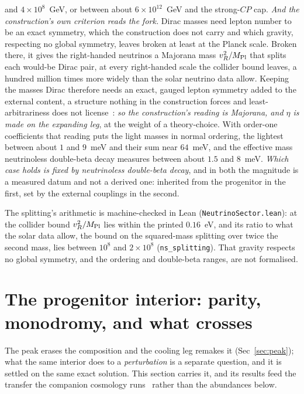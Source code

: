 \documentclass[11pt,a4paper]{article}
\theoremstyle{plain}
\theoremstyle{definition}
\theoremstyle{remark}
\begin{document}
and $4\times10^{8}$~GeV, or between about $6\times10^{12}$~GeV and the strong-$CP$ cap.
\emph{And the construction's own criterion reads the fork.} Dirac masses need lepton number to be an exact
symmetry, which the construction does not carry and which gravity, respecting no global symmetry, leaves broken at
least at the Planck scale. Broken there, it gives the right-handed neutrinos a Majorana mass $v_R^{2}/M_{\rm Pl}$
that splits each would-be Dirac pair, at every right-handed scale the collider bound leaves, a hundred million
times more widely than the solar neutrino data allow. Keeping the masses Dirac therefore needs an exact, gauged lepton symmetry
added to the external content, a structure nothing in the construction forces and least-arbitrariness does not
license~\cite{JanzenShadowExistence}: \emph{so the construction's reading is Majorana, and $\eta$ is made on the
expanding leg}, at the weight of a theory-choice. With order-one coefficients that reading puts the light masses in
normal ordering, the lightest between about $1$ and $9$~meV and their sum near $64$~meV, and the effective mass
neutrinoless double-beta decay measures between about $1.5$ and $8$~meV. \emph{Which case holds
is fixed by neutrinoless double-beta decay}, and in both the magnitude is a measured datum
and not a derived one: inherited from the progenitor in the first, set by the external couplings in the second.

The splitting's arithmetic is machine-checked in Lean (\texttt{NeutrinoSector.lean}): at the collider bound $v_R^{2}/M_{\rm Pl}$ lies within the printed $0.16$~eV, and its ratio to what the solar data allow, the bound on the squared-mass splitting over twice the second mass, lies between $10^{8}$ and $2\times10^{8}$ (\texttt{ns\_splitting}). That gravity respects no global symmetry, and the ordering and double-beta ranges, are not formalised.

\section{The progenitor interior: parity, monodromy, and what crosses}\label{sec:interior}
The peak erases the composition and the cooling leg remakes it (Sec~\ref{sec:peak}); what the same
interior does to a \emph{perturbation} is a separate question, and it is settled on the same exact
solution. This section carries it, and its results feed the transfer the companion cosmology
runs~\cite{JanzenCRcosmology} rather than the abundances below.
\end{document}
